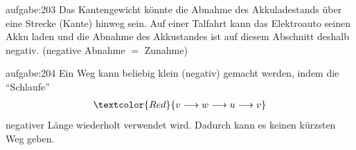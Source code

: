 \begin{antwort}{aufgabe:203}
Das Kantengewicht könnte die Abnahme des Akkuladestands über eine Strecke (Kante) hinweg sein. Auf einer Talfahrt kann das Elektroauto seinen Akku laden und die Abnahme des Akkustandes ist auf diesem Abschnitt deshalb negativ. (negative Abnahme $=$ Zunahme)
\end{antwort}


\begin{antwort}{aufgabe:204}
Ein Weg kann beliebig klein (negativ) gemacht werden, indem die \enquote{Schlaufe}
\begin{align*}
    \textcolor{Red}{ v \longrightarrow w \longrightarrow u \longrightarrow v}
\end{align*}
negativer Länge wiederholt verwendet wird. Dadurch kann es keinen kürzsten Weg geben.
\end{antwort}











